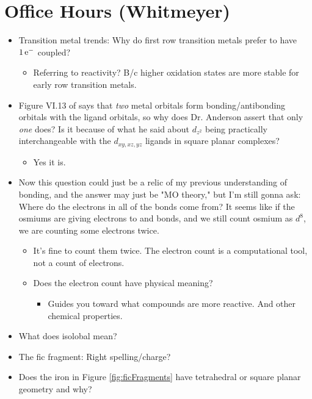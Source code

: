 \documentclass[../notes.tex]{subfiles}
\begin{document}
\section{Office Hours (Whitmeyer)}
\begin{itemize}
    \item {}Transition metal trends: Why do first row transition metals prefer to have $1\,\e[-]$ coupled?
    \begin{itemize}
        \item Referring to reactivity? B/c higher oxidation states are more stable for early row transition metals.
    \end{itemize}
    \item Figure VI.13 of \textcite{bib:CHEM20100Notes} says that \emph{two} metal orbitals form bonding/antibonding orbitals with the ligand orbitals, so why does Dr. Anderson assert that only \emph{one} does? Is it because of what he said about $d_{z^2}$ being practically interchangeable with the $d_{xy,xz,yz}$ ligands in square planar complexes?
    \begin{itemize}
        \item Yes it is.
    \end{itemize}
    \item Now this question could just be a relic of my previous understanding of bonding, and the answer may just be "MO theory," but I'm still gonna ask: Where do the electrons in all of the bonds come from? It seems like if the osmiums are giving electrons to  and  bonds, and we still count osmium as $d^8$, we are counting some electrons twice.
    \begin{itemize}
        \item It's fine to count them twice. The electron count is a computational tool, not a count of electrons.
        \item Does the electron count have physical meaning?
        \begin{itemize}
            \item Guides you toward what compounds are more reactive. And other chemical properties.
        \end{itemize}
    \end{itemize}
    \item What does isolobal mean?
    \item The fic fragment: Right spelling/charge?
    \item Does the iron in Figure \ref{fig:ficFragments} have tetrahedral or square planar geometry and why?

\end{itemize}
\end{document}
